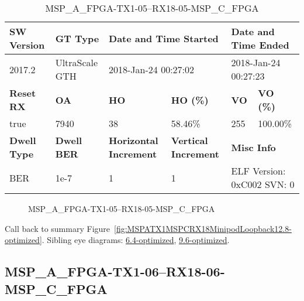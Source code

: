 \begin{table}[h]
\centering
\caption{MSP\_A\_FPGA-TX1-05--RX18-05-MSP\_C\_FPGA}
\label{tab:MSPAFPGATX105RX1805MSPCFPGA12.8-optimized}
\begin{tabular}{@{}|l|l|l|l|l|l|@{}}
\toprule
\textbf{SW Version}                & \textbf{GT Type}   & \multicolumn{2}{l|}{\textbf{Date and Time Started}}            & \multicolumn{2}{l|}{\textbf{Date and Time Ended}}        \\ \midrule
2017.2                       & UltraScale GTH          & \multicolumn{2}{l|}{2018-Jan-24 00:27:02}                   & \multicolumn{2}{l|}{2018-Jan-24 00:27:23}               \\ \midrule
\textbf{Reset RX}                  & \textbf{OA} & \textbf{HO}   & \textbf{HO (\%)} & \textbf{VO} & \textbf{VO (\%)} \\ \midrule
true & 7940        & 38          & 58.46\%        & 255        & 100.00\%       \\ \midrule
\textbf{Dwell Type}                & \textbf{Dwell BER} & \textbf{Horizontal Increment} & \textbf{Vertical Increment}    & \multicolumn{2}{l|}{\textbf{Misc Info}}                  \\ \midrule
BER                            & 1e-7        & 1        & 1           & \multicolumn{2}{l|}{ELF Version: 0xC002 SVN: 0}                         \\ \bottomrule
\end{tabular}
\end{table}

\begin{figure}[h]
\caption{MSP\_A\_FPGA-TX1-05--RX18-05-MSP\_C\_FPGA} \label{fig:MSPAFPGATX105RX1805MSPCFPGA12.8-optimized}
\end{figure}

Call back to summary Figure~\ref{fig:MSPATX1MSPCRX18MinipodLoopback12.8-optimized}.
Sibling eye diagrams: \hyperref[sec:MSPAFPGATX105RX1805MSPCFPGA6.4-optimized]{6.4-optimized}, \hyperref[sec:MSPAFPGATX105RX1805MSPCFPGA9.6-optimized]{9.6-optimized}.

\clearpage
\newpage


\subsection{MSP\_A\_FPGA-TX1-06--RX18-06-MSP\_C\_FPGA}\label{sec:MSPAFPGATX106RX1806MSPCFPGA12.8-optimized}

